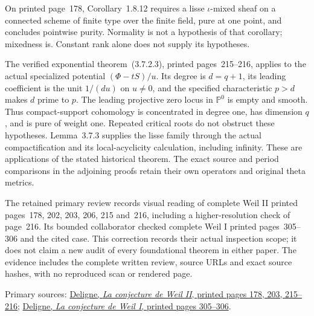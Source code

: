 On printed page~178, Corollary~1.8.12 requires a lisse
$\iota$-mixed sheaf on a connected scheme of finite type over the
finite field, pure at one point, and concludes pointwise purity.
Normality is not a hypothesis of that corollary; mixedness is.
Constant rank alone does not supply its hypotheses.

The verified exponential theorem~(3.7.2.3), printed pages~215--216,
applies to the actual specialized potential $(\Phi-tS)/u$.
Its degree is $d=q+1$, its leading coefficient is the unit $1/(du)$
on $u\ne0$, and the specified characteristic $p>d$ makes $d$
prime to $p$. The leading projective zero locus in $\mathbb P^0$
is empty and smooth. Thus compact-support cohomology is concentrated
in degree one, has dimension $q$, and is pure of weight one.
Repeated critical roots do not obstruct these hypotheses.
Lemma~3.7.3 supplies the lisse family through the actual compactification
and its local-acyclicity calculation, including infinity.
These are applications of the stated historical theorem. The exact
source and period comparisons in the adjoining proofs retain their
own operators and original theta metrics.

The retained primary review records visual reading of complete
Weil II printed pages~178, 202, 203, 206, 215 and~216, including
a higher-resolution check of page~216. Its bounded collaborator
checked complete Weil I printed pages~305--306 and the cited case.
This correction records their actual inspection scope; it does not
claim a new audit of every foundational theorem in either paper.
The evidence includes the complete written review, source URLs and
exact source hashes, with no reproduced scan or rendered page.

Primary sources:
\href{https://www.numdam.org/item/10.1007/BF02684780.pdf}
{Deligne, \emph{La conjecture de Weil II}, printed pages 178, 203, 215--216};
\href{https://www.numdam.org/item/PMIHES_1974__43__273_0.pdf}
{Deligne, \emph{La conjecture de Weil I}, printed pages 305--306}.
